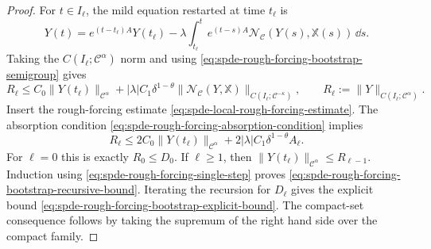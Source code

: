 \begin{proof}
For \(t\in I_\ell\), the mild equation restarted at time \(t_\ell\) is
\begin{equation}
  Y(t)
  =
  e^{(t-t_\ell)A}Y(t_\ell)
  -
  \lambda
  \int_{t_\ell}^t
  e^{(t-s)A}
  \mathcal N_{\mathcal C}(Y(s),\mathbb X(s))\,\dd s .
  \label{eq:spde-rough-forcing-restarted-mild}
\end{equation}
Taking the \(C(I_\ell;\mathcal C^\alpha)\) norm and using
\eqref{eq:spde-rough-forcing-bootstrap-semigroup} gives
\[
  R_\ell
  \leq
  C_0\|Y(t_\ell)\|_{\mathcal C^\alpha}
  +|\lambda|C_1\delta^{1-\theta}
  \|\mathcal N_{\mathcal C}(Y,\mathbb X)\|_
    {C(I_\ell;\mathcal C^{-\kappa})},
  \qquad
  R_\ell:=\|Y\|_{C(I_\ell;\mathcal C^\alpha)} .
\]
Insert the rough-forcing estimate
\eqref{eq:spde-local-rough-forcing-estimate}.  The absorption condition
\eqref{eq:spde-rough-forcing-absorption-condition} implies
\begin{equation}
  R_\ell
  \leq
  2C_0\|Y(t_\ell)\|_{\mathcal C^\alpha}
  +2|\lambda|C_1\delta^{1-\theta}A_\ell .
  \label{eq:spde-rough-forcing-single-step}
\end{equation}
For \(\ell=0\) this is exactly \(R_0\leq D_0\).  If \(\ell\geq1\), then
\(\|Y(t_\ell)\|_{\mathcal C^\alpha}\leq R_{\ell-1}\).  Induction using
\eqref{eq:spde-rough-forcing-single-step} proves
\eqref{eq:spde-rough-forcing-bootstrap-recursive-bound}.  Iterating the
recursion for \(D_\ell\) gives the explicit bound
\eqref{eq:spde-rough-forcing-bootstrap-explicit-bound}.  The compact-set
consequence follows by taking the supremum of the right hand side over the
compact family.
\end{proof}

